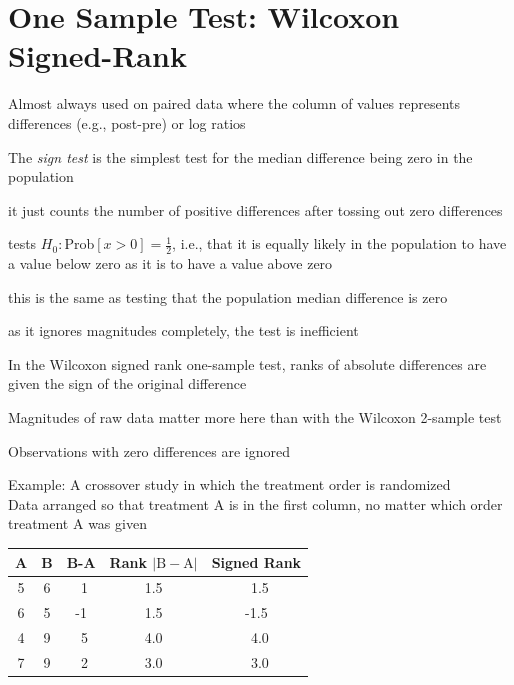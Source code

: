 \section{One Sample Test: Wilcoxon Signed-Rank} 
\bi
\item Almost always used on paired data where the column of values
  represents differences (e.g., post-pre) or log ratios
\item The \emph{sign test} is the simplest test for the median
  difference being zero in the population
 \bi
 \item it just counts the number of positive differences after tossing
   out zero differences
 \item tests $H_{0}:$Prob$[x>0]=\frac{1}{2}$, i.e., that it is
   equally likely in the population to have a value below zero as it
   is to have a value above zero
 \item this is the same as testing that the population median
   difference is zero
 \item as it ignores magnitudes completely, the test is inefficient
 \ei
\item In the Wilcoxon signed rank one-sample test, ranks of absolute
  differences are given the sign of the original difference
\item Magnitudes of raw data matter more here than with the Wilcoxon
  2-sample test
\item Observations with zero differences are ignored

\item Example: A crossover study in which the treatment order is  randomized \\
  Data arranged so that treatment A is in the first column, no matter which order treatment A was given


\begin{center}
\begin{tabular}{ccccc} \hline
A & B & B-A & Rank $|\mathrm{B-A}|$ & Signed Rank \\ \hline
5 & 6 & ~1 & 1.5 & ~1.5 \\
6 & 5 & -1 & 1.5 & -1.5 \\
4 & 9 & ~5 & 4.0 & ~4.0 \\
7 & 9 & ~2 & 3.0 & ~3.0 \\ \hline
\end{tabular}\end{center}

